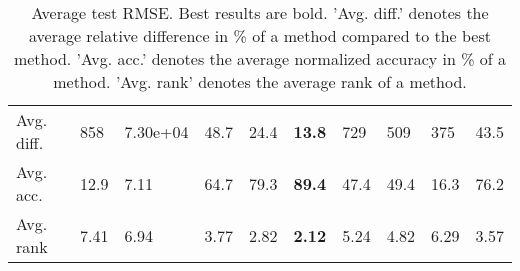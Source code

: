 \begin{table}[ht!]
\begin{tabular}{llllllllll}
   \hline
Avg. diff. & 858 & 7.30e+04 & 48.7 & 24.4 & \textbf{13.8} & 729 & 509 & 375 & 43.5 \\ 
  Avg. acc. & 12.9 & 7.11 & 64.7 & 79.3 & \textbf{89.4} & 47.4 & 49.4 & 16.3 & 76.2 \\ 
  Avg. rank & 7.41 & 6.94 & 3.77 & 2.82 & \textbf{2.12} & 5.24 & 4.82 & 6.29 & 3.57 \\ 
   \hline
\hline
\end{tabular}
\endgroup
\caption{Average test RMSE. 
                  Best results are bold. 
                  'Avg. diff.' denotes the average relative difference in \% of a method compared to the best method.
                  'Avg. acc.' denotes the average normalized accuracy in \% of a method.
                  'Avg. rank' denotes the average rank of a method.} 
\label{TABLES/table_results_RMSE_k_medoids}
\end{table}

